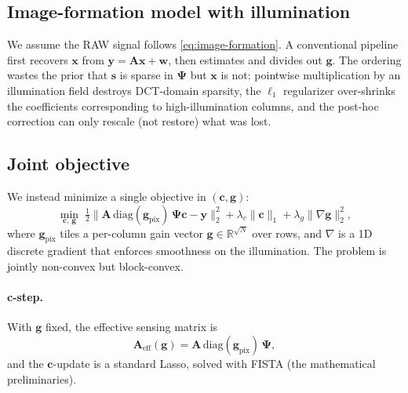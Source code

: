\documentclass{article}
\begin{document}
\subsection{Image-formation model with illumination}

We assume the RAW signal follows \eqref{eq:image-formation}. A conventional pipeline first recovers $\boldsymbol{x}$ from $\boldsymbol{y} = \boldsymbol{A}\boldsymbol{x} + \boldsymbol{w}$, then estimates and divides out $\boldsymbol{g}$. The ordering wastes the prior that $\boldsymbol{s}$ is sparse in $\boldsymbol{\Psi}$ but $\boldsymbol{x}$ is not: pointwise multiplication by an illumination field destroys DCT-domain sparsity, the $\ell_1$ regularizer over-shrinks the coefficients corresponding to high-illumination columns, and the post-hoc correction can only rescale (not restore) what was lost.

\subsection{Joint objective}

We instead minimize a single objective in $(\boldsymbol{c}, \boldsymbol{g})$:
\begin{equation}
  \min_{\boldsymbol{c},\,\boldsymbol{g}}\;
  \tfrac{1}{2}\big\|\boldsymbol{A}\,\mathrm{diag}(\boldsymbol{g}_\text{pix})\,
  \boldsymbol{\Psi}\boldsymbol{c} - \boldsymbol{y}\big\|_2^2
  + \lambda_c \|\boldsymbol{c}\|_1
  + \lambda_g \|\nabla \boldsymbol{g}\|_2^2,
  \label{eq:joint}
\end{equation}
where $\boldsymbol{g}_\text{pix}$ tiles a per-column gain vector $\boldsymbol{g} \in \mathbb{R}^{\sqrt{N}}$ over rows, and $\nabla$ is a 1D discrete gradient that enforces smoothness on the illumination. The problem is jointly non-convex but block-convex.

\paragraph{c-step.} With $\boldsymbol{g}$ fixed, the effective sensing matrix is
\begin{equation}
  \boldsymbol{A}_{\text{eff}}(\boldsymbol{g}) = \boldsymbol{A}\,\mathrm{diag}(\boldsymbol{g}_\text{pix})\,\boldsymbol{\Psi},
\end{equation}
and the $\boldsymbol{c}$-update is a standard Lasso, solved with FISTA (the mathematical preliminaries).
\end{document}
